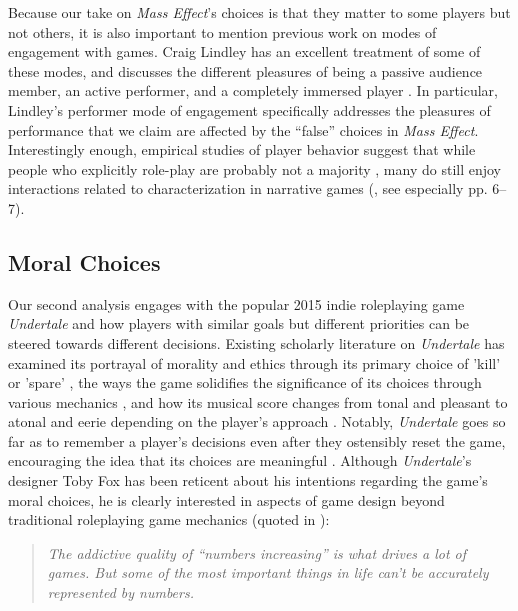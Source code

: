 \documentclass[arts,article,submit,moreauthors,pdftex,10pt,a4paper]{Definitions/mdpi}
\begin{document}
Because our take on \emph{Mass Effect}'s choices is that they matter to some players but not others, it is also important to mention previous work on modes of engagement with games.
%
Craig Lindley has an excellent treatment of some of these modes, and discusses the different pleasures of being a passive audience member, an active performer, and a completely immersed player \citep{lindley2005story}.
%
In particular, Lindley's performer mode of engagement specifically addresses the pleasures of performance that we claim are affected by the ``false'' choices in \emph{Mass Effect}.
%
Interestingly enough, empirical studies of player behavior suggest that while people who explicitly role-play are probably not a majority \citep{lange2014youre}, many do still enjoy interactions related to characterization in narrative games (\cite{mallon2005stand}, see especially pp. 6--7).

\subsection{Moral Choices}

Our second analysis engages with the popular 2015 indie roleplaying game \emph{Undertale} and how players with similar goals but different priorities can be steered towards different decisions.
%
Existing scholarly literature on \emph{Undertale} has examined its portrayal of morality and ethics through its primary choice of 'kill' or 'spare' \citep{muller2017undertale}, the ways the game solidifies the significance of its choices through various mechanics \citep{day2017agency}, and how its musical score changes from tonal and pleasant to atonal and eerie depending on the player's approach \citep{perez2017undertale}.
%
Notably, \emph{Undertale} goes so far as to remember a player's decisions even after they ostensibly reset the game, encouraging the idea that its choices are meaningful \citep{hughes2015undertale}.
%
Although \emph{Undertale}'s designer Toby Fox has been reticent about his intentions regarding the game's moral choices, he is clearly interested in aspects of game design beyond traditional roleplaying game mechanics (quoted in \cite{feeld2015interview}):

\begin{quote}
  \itshape
The addictive quality of ``numbers increasing'' is what drives a lot of games. But some of the most important things in life can't be accurately represented by numbers.
\end{quote}
\end{document}
